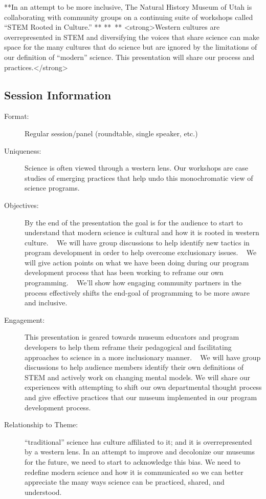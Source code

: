 \documentclass{report}
\begin{document}
              **In an attempt to be more inclusive, The Natural History Museum of Utah is collaborating with community groups on a continuing suite of workshops called “STEM Rooted in Culture.” **
** **
<strong>Western cultures are overrepresented in STEM and diversifying the voices that share science can make space for the many cultures that do science but are ignored by the limitations of our definition of “modern” science. This presentation will share our process and practices.</strong>

              \subsection*{Session Information}
                \begin{description}
                  \item [Format:] Regular session/panel (roundtable, single speaker, etc.)
							    
							    \item [Uniqueness:]Science is often viewed through a western lens. Our workshops are case studies of emerging practices that help undo this monochromatic view of science programs.
							    \item [Objectives:]By the end of the presentation the goal is for the audience to start to understand that modern science is cultural and how it is rooted in western culture. 
 
We will have group discussions to help identify new tactics in program development in order to help overcome exclusionary issues. 
 
We will give action points on what we have been doing during our program development process that has been working to reframe our own programming. 
 
We’ll show how engaging community partners in the process effectively shifts the end-goal of programming to be more aware and inclusive.
							    \item [Engagement:]This presentation is geared towards museum educators and program developers to help them reframe their pedagogical and facilitating approaches to science in a more inclusionary manner. 
 
We will have group discussions to help audience members identify their own definitions of STEM and actively work on changing mental models. We will share our experiences with attempting to shift our own departmental thought process and give effective practices that our museum implemented in our program development process.
							    \item [Relationship to Theme:]“traditional” science has culture affiliated to it; and it is overrepresented by a western lens. In an attempt to improve and decolonize our museums for the future, we need to start to acknowledge this bias. We need to redefine modern science and how it is communicated so we can better appreciate the many ways science can be practiced, shared, and understood.
							    
                \end{description}
\end{document}
